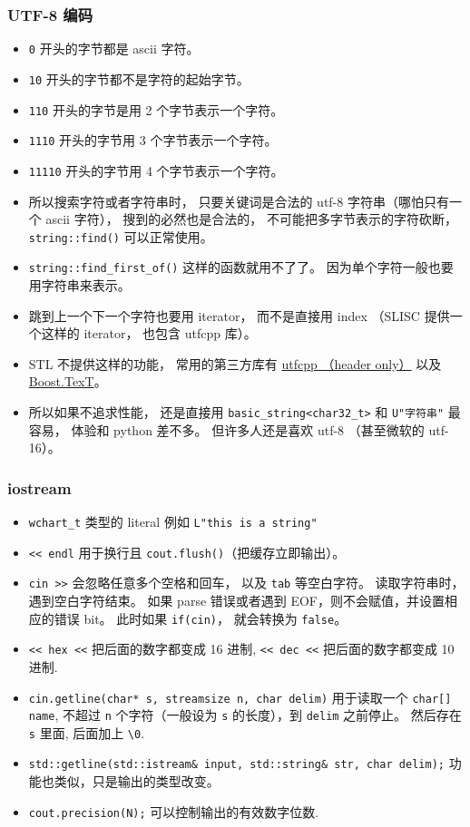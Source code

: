 \subsubsection{UTF-8 编码}
\begin{itemize}
\item \verb|0| 开头的字节都是 ascii 字符。
\item \verb|10| 开头的字节都不是字符的起始字节。
\item \verb|110| 开头的字节是用 2 个字节表示一个字符。
\item \verb|1110| 开头的字节用 3 个字节表示一个字符。
\item \verb|11110| 开头的字节用 4 个字节表示一个字符。
\item 所以搜索字符或者字符串时， 只要关键词是合法的 utf-8 字符串（哪怕只有一个 ascii 字符）， 搜到的必然也是合法的， 不可能把多字节表示的字符砍断， \verb|string::find()| 可以正常使用。
\item \verb|string::find_first_of()| 这样的函数就用不了了。 因为单个字符一般也要用字符串来表示。
\item 跳到上一个下一个字符也要用 iterator， 而不是直接用 index （SLISC 提供一个这样的 iterator， 也包含 utfcpp 库）。
\item STL 不提供这样的功能， 常用的第三方库有 \href{https://github.com/nemtrif/utfcpp}{utfcpp （header only）} 以及 \href{https://tzlaine.github.io/text/doc/html/index.html}{Boost.TexT}。
\item 所以如果不追求性能， 还是直接用 \verb|basic_string<char32_t>| 和 \verb|U"字符串"| 最容易， 体验和 python 差不多。 但许多人还是喜欢 utf-8 （甚至微软的 utf-16）。
\end{itemize}


\subsubsection{iostream}
\begin{itemize}
\item \verb`wchart_t` 类型的 literal 例如 \verb`L"this is a string"`
\item \verb`<< endl` 用于换行且 \verb|cout.flush()|（把缓存立即输出）。
\item \verb|cin >>| 会忽略任意多个空格和回车， 以及 \verb|tab| 等空白字符。 读取字符串时，遇到空白字符结束。 如果 parse 错误或者遇到 EOF，则不会赋值，并设置相应的错误 bit。 此时如果 \verb|if(cin)|， 就会转换为 \verb|false|。
\item \verb`<< hex <<` 把后面的数字都变成 16 进制, \verb`<< dec <<` 把后面的数字都变成 10 进制.
\item \verb`cin.getline(char* s, streamsize n, char delim)` 用于读取一个 \verb`char[] name`, 不超过 \verb|n| 个字符（一般设为 \verb|s| 的长度），到 \verb|delim| 之前停止。 然后存在 \verb|s| 里面, 后面加上 \verb`\0`.
\item \verb|std::getline(std::istream& input, std::string& str, char delim);| 功能也类似，只是输出的类型改变。
\item \verb`cout.precision(N);` 可以控制输出的有效数字位数.
\end{itemize}

